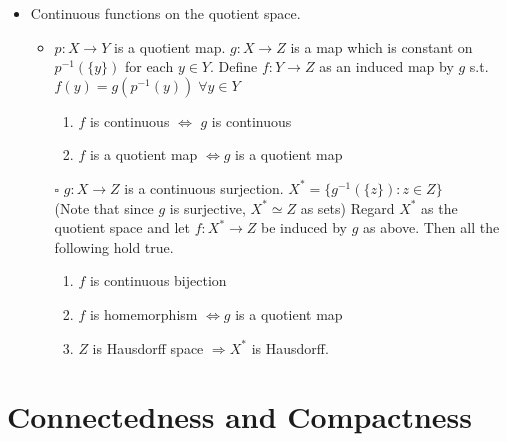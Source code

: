 \documentclass[12pt]{article}
\newcommand{\sq}{$\square$}
\begin{document}
\begin{itemize}
\begin{itemize}
	\end{itemize}
	\item Continuous functions on the quotient space.
	\begin{itemize}
		\item $p:X\rightarrow Y$ is a quotient map. $g:X\rightarrow Z$ is a map which is constant on $p^{-1}(\{y\})$ for each $y\in Y$. Define $f:Y\rightarrow Z$ as an induced map by $g$ s.t. $f(y)=g(p^{-1}(y))\;\forall y\in Y$
		\begin{enumerate}
			\item $f$ is continuous $\Leftrightarrow$ $g$ is continuous
			\item $f$ is a quotient map $\Leftrightarrow g$ is a quotient map
		\end{enumerate}
		\item[\sq] $g:X\rightarrow Z$ is a continuous surjection. $X^*=\{g^{-1}(\{z\}):z\in Z\}$ \\(Note that since $g$ is surjective, $X^*\simeq Z$ as sets) Regard $X^*$ as the quotient space and let $f:X^*\rightarrow Z $ be induced by $g$ as above. Then all the following hold true.
		\begin{enumerate}
			\item $f$ is continuous bijection
			\item $f$ is homemorphism $\Leftrightarrow g$ is a quotient map
			\item $Z$ is Hausdorff space $\Rightarrow X^*$ is Hausdorff. 
		\end{enumerate}
	\end{itemize}
\end{itemize}
\clearpage

\section{Connectedness and Compactness}
\bigskip
\end{document}
